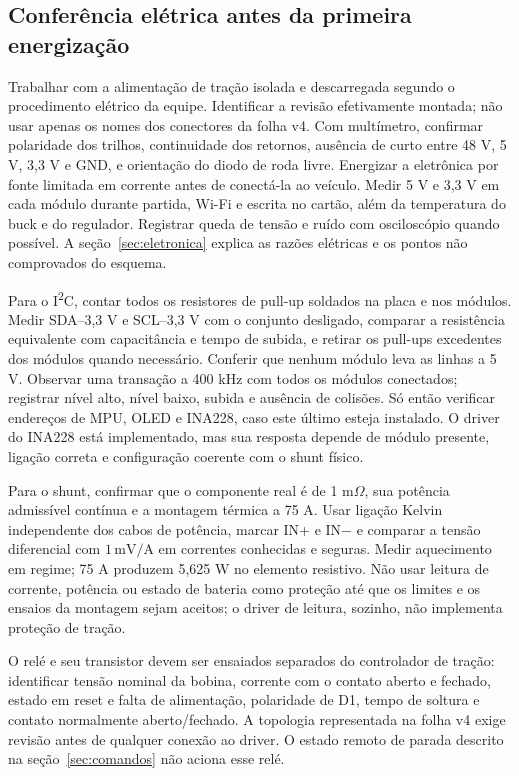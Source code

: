 \subsection{Conferência elétrica antes da primeira energização}\label{sec:conferencia-eletrica}
Trabalhar com a alimentação de tração isolada e descarregada segundo o procedimento elétrico da equipe. Identificar a revisão efetivamente montada; não usar apenas os nomes dos conectores da folha v4. Com multímetro, confirmar polaridade dos trilhos, continuidade dos retornos, ausência de curto entre 48 V, 5 V, 3,3 V e GND, e orientação do diodo de roda livre. Energizar a eletrônica por fonte limitada em corrente antes de conectá-la ao veículo. Medir 5 V e 3,3 V em cada módulo durante partida, Wi-Fi e escrita no cartão, além da temperatura do buck e do regulador. Registrar queda de tensão e ruído com osciloscópio quando possível. A seção~\ref{sec:eletronica} explica as razões elétricas e os pontos não comprovados do esquema.

Para o I\textsuperscript{2}C, contar todos os resistores de pull-up soldados na placa e nos módulos. Medir SDA--3,3 V e SCL--3,3 V com o conjunto desligado, comparar a resistência equivalente com capacitância e tempo de subida, e retirar os pull-ups excedentes dos módulos quando necessário. Conferir que nenhum módulo leva as linhas a 5 V. Observar uma transação a 400 kHz com todos os módulos conectados; registrar nível alto, nível baixo, subida e ausência de colisões. Só então verificar endereços de MPU, OLED e INA228, caso este último esteja instalado. O driver do INA228 está implementado, mas sua resposta depende de módulo presente, ligação correta e configuração coerente com o shunt físico.

Para o shunt, confirmar que o componente real é de 1 m$\Omega$, sua potência admissível contínua e a montagem térmica a 75 A. Usar ligação Kelvin independente dos cabos de potência, marcar IN+ e IN$-$ e comparar a tensão diferencial com $1\,\mathrm{mV/A}$ em correntes conhecidas e seguras. Medir aquecimento em regime; 75 A produzem 5,625 W no elemento resistivo. Não usar leitura de corrente, potência ou estado de bateria como proteção até que os limites e os ensaios da montagem sejam aceitos; o driver de leitura, sozinho, não implementa proteção de tração.

O relé e seu transistor devem ser ensaiados separados do controlador de tração: identificar tensão nominal da bobina, corrente com o contato aberto e fechado, estado em reset e falta de alimentação, polaridade de D1, tempo de soltura e contato normalmente aberto/fechado. A topologia representada na folha v4 exige revisão antes de qualquer conexão ao driver. O estado remoto de parada descrito na seção~\ref{sec:comandos} não aciona esse relé.

